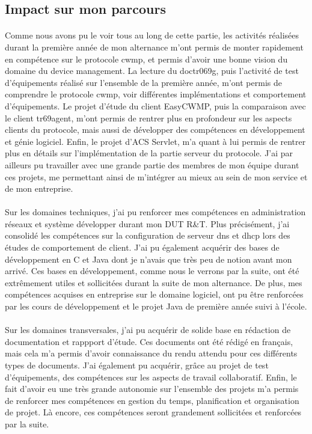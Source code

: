 \documentclass[12pt,a4paper]{report}
\begin{document}
\subsection{Impact sur mon parcours}
\paragraph*{}Comme nous avons pu le voir tous au long de cette partie, les activités réalisées durant la première année de mon alternance m'ont permis de monter rapidement en compétence sur le protocole \gls{cwmp}, et permis d'avoir une bonne vision du domaine du device management. La lecture du \gls{doctr069g}, puis l'activité de test d'équipements réalisé sur l'ensemble de la première année, m'ont permis de comprendre le protocole \gls{cwmp}, voir différentes implémentations et comportement d'équipements. Le projet d'étude du client EasyCWMP, puis la comparaison avec le client tr69agent, m'ont permis de rentrer plus en profondeur sur les aspects clients du protocole, mais aussi de développer des compétences en développement et génie logiciel. Enfin, le projet d'ACS Servlet, m'a quant à lui permis de rentrer plus en détails sur l'implémentation de la partie serveur du protocole. J'ai par ailleurs pu travailler avec une grande partie des membres de mon équipe durant ces projets, me permettant ainsi de m'intégrer au mieux au sein de mon service et de mon entreprise. 
\paragraph*{}Sur les domaines techniques, j'ai pu renforcer mes compétences en administration réseaux et système développer durant mon DUT R\&T. Plus précisément, j'ai consolidé les compétences sur la configuration de serveur \gls{dns} et \gls{dhcp} lors des études de comportement de client. J'ai pu également acquérir des bases de développement en C et Java dont je n'avais que très peu de notion avant mon arrivé. Ces bases en développement, comme nous le verrons par la suite, ont été extrêmement utiles et sollicitées durant la suite de mon alternance. De plus, mes compétences acquises en entreprise sur le domaine logiciel, ont pu être renforcées par les cours de développement et le projet Java de première année suivi à l'école. 
\paragraph*{}Sur les domaines transversales, j'ai pu acquérir de solide base en rédaction de documentation et rappport d'étude. Ces documents ont été rédigé en français, mais cela m'a permis d'avoir connaissance du rendu attendu pour ces différents types de documents. J'ai également pu acquérir, grâce au projet de test d'équipements, des compétences sur les aspects de travail collaboratif. Enfin, le fait d'avoir eu une très grande autonomie sur l'ensemble des projets m'a permis de renforcer mes compétences en gestion du temps, planification et organisation de projet. Là encore, ces compétences seront grandement sollicitées et renforcées par la suite.
\end{document}
